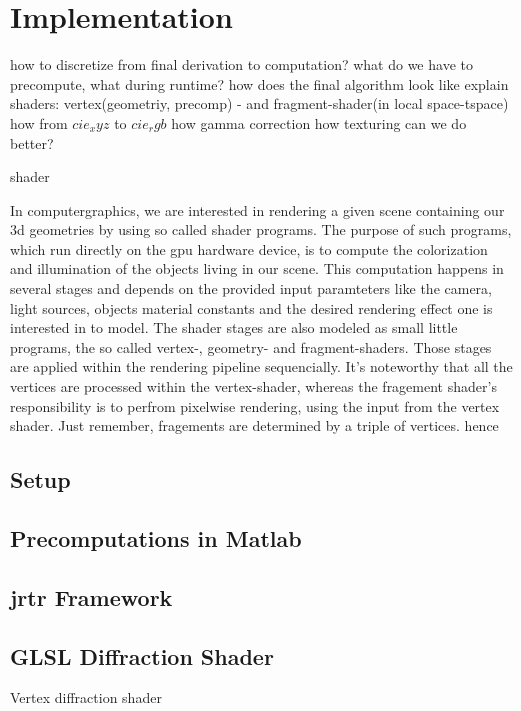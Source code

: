 \section{Implementation}

how to discretize from final derivation to computation?
what do we have to precompute, what during runtime?
how does the final algorithm look like
explain shaders: vertex(geometriy, precomp) - and fragment-shader(in local space-tspace)
how from $cie_xyz$ to $cie_rgb$
how gamma correction
how texturing 
can we do better?


shader

In computergraphics, we are interested in rendering a given scene containing our 3d geometries by using so called shader programs. 
The purpose of such programs, which run directly on the gpu hardware device, is to compute the colorization and illumination of the objects living in our scene. This computation happens in several stages and depends on the provided input paramteters like the camera, light sources, objects material constants and the desired rendering effect one is interested in to model. The shader stages are also modeled as small little programs, the so called vertex-, geometry- and fragment-shaders. Those stages are applied within the rendering pipeline sequencially. It's noteworthy that all the vertices are processed within the vertex-shader, whereas the fragement shader's responsibility is to perfrom pixelwise rendering, using the input from the vertex shader. Just remember, fragements are determined by a triple of vertices. hence 





\subsection{Setup}
\subsection{Precomputations in Matlab}
\subsection{jrtr Framework}
\subsection{GLSL Diffraction Shader}


\begin{algorithm}
  \caption{Vertex diffraction shader}
  \begin{algorithmic}
    \EndFor
  \end{algorithmic}
\end{algorithm}

